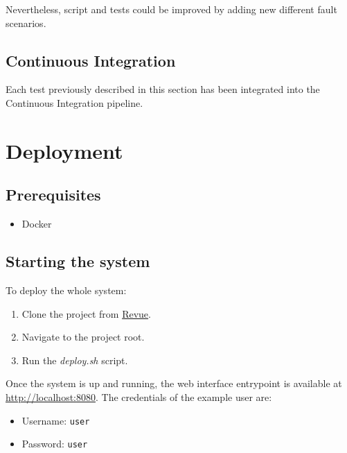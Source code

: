 \documentclass{scrartcl}
\begin{document}
    Nevertheless, script and tests could be improved by adding new different fault scenarios.

    

    \subsection{Continuous Integration}\label{subsec:continuous-integration}

    Each test previously described in this section has been integrated into the Continuous Integration pipeline.

    \section{Deployment}

    \subsection{Prerequisites}

    \begin{itemize}
        \item Docker
    \end{itemize}

    \subsection{Starting the system}

    To deploy the whole system:
    \begin{enumerate}
        \item Clone the project from \href{https://github.com/Mala1180/revue/}{Revue}.
        \item Navigate to the project root.
        \item Run the \textit{deploy.sh} script.
    \end{enumerate}

    Once the system is up and running, the web interface entrypoint is available at \href{http://localhost:8080}{http://localhost:8080}.
    The credentials of the example user are:
    \begin{itemize}
        \item Username: \verb|user|
        \item Password: \verb|user|
    \end{itemize}
\end{document}
